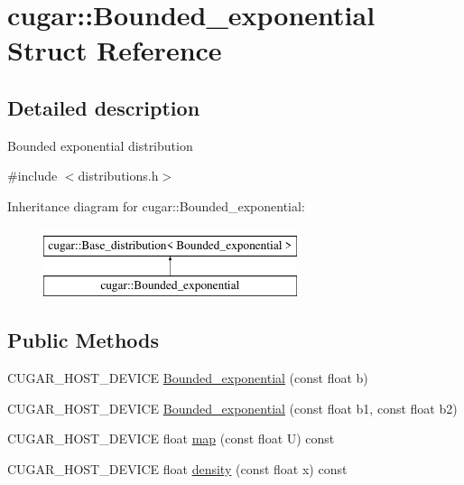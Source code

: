 \hypertarget{structcugar_1_1_bounded__exponential}{}\section{cugar\+:\+:Bounded\+\_\+exponential Struct Reference}
\label{structcugar_1_1_bounded__exponential}


\subsection{Detailed description}
Bounded exponential distribution 

{\ttfamily \#include $<$distributions.\+h$>$}

Inheritance diagram for cugar\+:\+:Bounded\+\_\+exponential\+:\begin{figure}[H]
\begin{center}
\leavevmode
\includegraphics[height=2.000000cm]{structcugar_1_1_bounded__exponential}
\end{center}
\end{figure}
\subsection*{Public Methods}
\begin{DoxyCompactItemize}
\item 
C\+U\+G\+A\+R\+\_\+\+H\+O\+S\+T\+\_\+\+D\+E\+V\+I\+CE \hyperlink{structcugar_1_1_bounded__exponential_a45e239571b2ff1fe112e2fbb1133b1c6}{Bounded\+\_\+exponential} (const float b)
\item 
C\+U\+G\+A\+R\+\_\+\+H\+O\+S\+T\+\_\+\+D\+E\+V\+I\+CE \hyperlink{structcugar_1_1_bounded__exponential_accd30297a306778bd0a85fb0e25fe395}{Bounded\+\_\+exponential} (const float b1, const float b2)
\item 
C\+U\+G\+A\+R\+\_\+\+H\+O\+S\+T\+\_\+\+D\+E\+V\+I\+CE float \hyperlink{structcugar_1_1_bounded__exponential_a0678c62a51ca6b329d70ffdebf676c94}{map} (const float U) const
\item 
C\+U\+G\+A\+R\+\_\+\+H\+O\+S\+T\+\_\+\+D\+E\+V\+I\+CE float \hyperlink{structcugar_1_1_bounded__exponential_a9beb28b31e411c401184fd1017fd0189}{density} (const float x) const
\end{DoxyCompactItemize}


